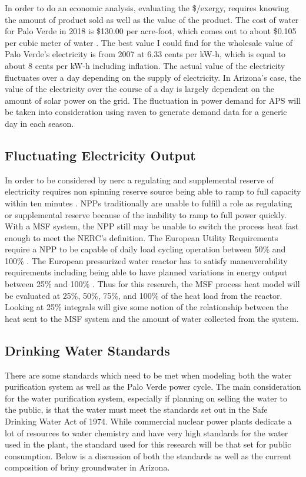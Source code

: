 \documentclass[12pt]{UIdahoMastersThesis}
\begin{document}
In order to do an economic analysis, evaluating the \$/exergy, requires knowing the amount of product sold as well as the value of the product. The cost of water for Palo Verde in 2018 is \$130.00 per acre-foot, which comes out to about \$0.105 per cubic meter of water \cite{Brown2018}. The best value I could find for the wholesale value of Palo Verde's electricity is from 2007 at 6.33 cents per kW-h, which is equal to about 8 cents per kW-h including inflation. The actual value of the electricity fluctuates over a day depending on the supply of electricity.  In Arizona's case, the value of the electricity over the course of a day is largely dependent on the amount of solar power on the grid. The fluctuation in power demand for \ac{APS} will be taken into consideration using \ac{raven} to generate demand data for a generic day in each season.  

\subsection{Fluctuating Electricity Output}

In order to be considered by \ac{nerc} a regulating and supplemental reserve of electricity requires non spinning reserve source being able to ramp to full capacity within ten minutes \cite{NERC2014}. NPPs traditionally are unable to fulfill a role as regulating or supplemental reserve because of the inability to ramp to full power quickly.  With a MSF system, the NPP still may be unable to switch the process heat fast enough to meet the NERC's definition. The European Utility Requirements require a NPP to be capable of daily load cycling operation between 50\% and 100\% . The European pressurized water reactor has to satisfy maneuverability requirements including being able to have planned variations in energy output between 25\% and 100\% \cite{NEA2011}. Thus for this research, the MSF process heat model will be evaluated at 25\%, 50\%, 75\%, and 100\% of the heat load from the reactor. Looking at 25\% integrals will give some notion of the relationship between the heat sent to the MSF system and the amount of water collected from the system.

\subsection{Drinking Water Standards}
There are some standards which need to be met when modeling both the water purification system as well as the Palo Verde power cycle.  The main consideration for the water purification system, especially if planning on selling the water to the public, is that the water must meet the standards set out in the Safe Drinking Water Act of 1974. While commercial nuclear power plants dedicate a lot of resources to water chemistry and have very high standards for the water used in the plant, the standard used for this research will be that set for public consumption. Below is a discussion of both the standards as well as the current composition of briny groundwater in Arizona. 
\end{document}
